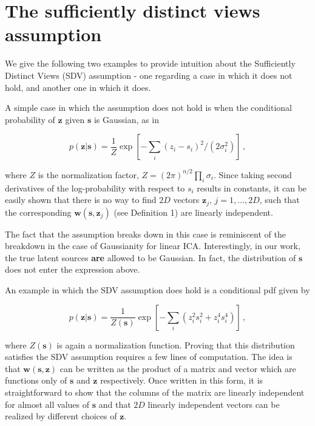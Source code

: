 \section{The sufficiently distinct views assumption}
\label{appendix:sdv}

We give the following two examples to provide intuition about the Sufficiently Distinct Views (SDV) assumption - one regarding a case in which it does not hold, and another one in which it does.


A simple case in which the assumption does not hold is when the conditional probability of $\bm{z}$ given $\bm{s}$ is Gaussian, as in

\begin{equation}
p(\bm{z}|\bm{s}) = \frac{1}{Z} \exp\left[ -\sum_i (z_i - s_i)^2/(2\sigma_i^2) \right]\,, \label{eq:unsatisfied}
\end{equation}

where $Z$ is the normalization factor, $Z = (2\pi)^{n/2}  \prod_i \sigma_i$.
Since taking second derivatives of the log-probability with respect to $s_i$ results in constants,
it can be easily shown that there is no way to find $2D$ vectors $\bm{z}_j$, $j=1, \ldots, 2D$, such that the corresponding $\bm{w}(\bm{s}, \bm{z}_j)$ (see Definition 1) are linearly independent.


The fact that the assumption breaks down in this case is reminiscent of the breakdown in the case of Gaussianity for linear ICA. Interestingly, in our work, the true latent sources \textbf{are} allowed to be Gaussian. In fact, the distribution of $\bm{s}$ does not enter the expression above.


An example in which the SDV assumption does hold is a conditional pdf given by

\begin{equation}
p(\bm{z}|\bm{s}) = \frac{1}{Z(\bm{s})} \exp \left[ - \sum_i (z_i^2  s_i^2 + z_i^4 s_i^4  ) \right]\,, \label{eq:satisfied}
\end{equation}

where $Z(\bm{s})$ is again a normalization function.
Proving that this distribution satisfies the SDV assumption requires a few lines of computation.
The idea is that $\bm{w}(\bm{s}, \bm{z})$ can be written as the product of a matrix and vector which are functions only of $\bm{s}$ and $\bm{z}$ respectively.
Once written in this form, it is straightforward to show that the columns of the matrix are linearly independent for almost all values of $\bm{s}$ and that $2D$ linearly independent vectors can be realized by different choices of $\bm{z}$.

